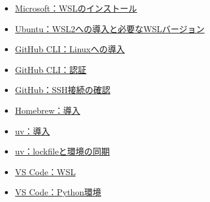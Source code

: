 \begin{itemize}
\item \href{https://learn.microsoft.com/en-us/windows/wsl/install}{Microsoft：WSLのインストール}

\item \href{https://ubuntu.com/wsl/docs/stable/howto/install-ubuntu-wsl2/}{Ubuntu：WSL2への導入と必要なWSLバージョン}

\item \href{https://github.com/cli/cli/blob/trunk/docs/install_linux.md}{GitHub CLI：Linuxへの導入}

\item \href{https://cli.github.com/manual/gh_auth_login}{GitHub CLI：認証}

\item \href{https://docs.github.com/en/authentication/connecting-to-github-with-ssh/testing-your-ssh-connection}{GitHub：SSH接続の確認}

\item \href{https://brew.sh/}{Homebrew：導入}

\item \href{https://docs.astral.sh/uv/getting-started/installation/}{uv：導入}

\item \href{https://docs.astral.sh/uv/concepts/projects/sync/}{uv：lockfileと環境の同期}

\item \href{https://code.visualstudio.com/docs/remote/wsl}{VS Code：WSL}

\item \href{https://code.visualstudio.com/docs/python/environments}{VS Code：Python環境}

\end{itemize}
